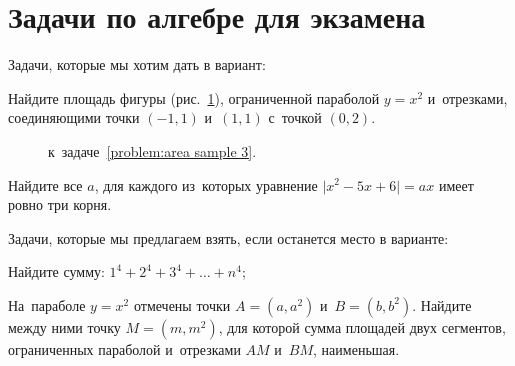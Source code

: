\section*{Задачи по алгебре для экзамена}

\begingroup
    \def\abs#1{\lvert #1 \rvert}%

Задачи, которые мы хотим дать в вариант:

\begin{problems}

\item\label{problem:area sample 3}%
Найдите площадь фигуры (рис.~\ref{fig:area sample 3}), ограниченной
параболой $y = x^2$ и~отрезками, соединяющими точки $(-1, 1)$ и~$(1, 1)$
с~точкой $(0, 2)$.

\begin{figure}[ht]\begin{center}
    \caption{к~задаче~\ref{problem:area sample 3}.}
    \label{fig:area sample 3}
\end{center}\end{figure}

\item
Найдите все $a$, для каждого из~которых уравнение $\abs{x^2 - 5 x + 6} = a x$
имеет ровно три корня.

\end{problems}

Задачи, которые мы предлагаем взять, если останется место в варианте:

\begin{problems}

\item
Найдите сумму: $1^4 + 2^4 + 3^4 + \ldots + n^4$;

\item
На~параболе $y = x^2$ отмечены точки $A = (a, a^2)$ и~$B = (b, b^2)$.
Найдите между ними точку $M = (m, m^2)$, для которой сумма площадей двух
сегментов, ограниченных параболой и~отрезками $AM$ и~$BM$, наименьшая.


\end{problems}

\endgroup %

